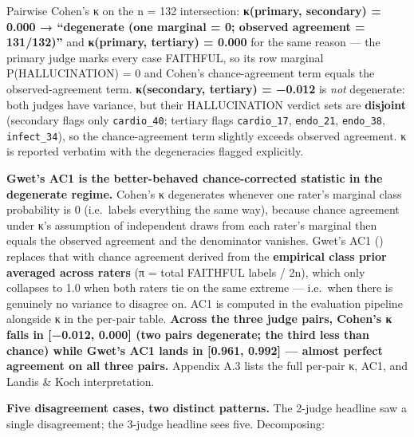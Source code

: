 \documentclass[
  american,
  a4paper,
]{article}
\begin{document}
Pairwise Cohen's κ on the n = 132 intersection: \textbf{κ(primary,
secondary) = 0.000 → ``degenerate (one marginal = 0; observed agreement
= 131/132)''} and \textbf{κ(primary, tertiary) = 0.000} for the same
reason --- the primary judge marks every case FAITHFUL, so its row
marginal P(HALLUCINATION) = 0 and Cohen's chance-agreement term equals
the observed-agreement term. \textbf{κ(secondary, tertiary) = −0.012} is
\emph{not} degenerate: both judges have variance, but their
HALLUCINATION verdict sets are \textbf{disjoint} (secondary flags only
\texttt{cardio\_40}; tertiary flags \texttt{cardio\_17},
\texttt{endo\_21}, \texttt{endo\_38}, \texttt{infect\_34}), so the
chance-agreement term slightly exceeds observed agreement. κ is reported
verbatim with the degeneracies flagged explicitly.

\textbf{Gwet's AC1 is the better-behaved chance-corrected statistic in
the degenerate regime.} Cohen's κ degenerates whenever one rater's
marginal class probability is 0 (i.e.~labels everything the same way),
because chance agreement under κ's assumption of independent draws from
each rater's marginal then equals the observed agreement and the
denominator vanishes. Gwet's AC1 () replaces that with chance agreement derived from the
\textbf{empirical class prior averaged across raters} (π = total
FAITHFUL labels / 2n), which only collapses to 1.0 when both raters tie
on the same extreme --- i.e.~when there is genuinely no variance to
disagree on. AC1 is computed in the evaluation pipeline alongside κ in
the per-pair table. \textbf{Across the three judge pairs, Cohen's κ
falls in {[}−0.012, 0.000{]} (two pairs degenerate; the third less than
chance) while Gwet's AC1 lands in {[}0.961, 0.992{]} --- almost perfect
agreement on all three pairs.} Appendix A.3 lists the full per-pair κ,
AC1, and Landis \& Koch interpretation.

\textbf{Five disagreement cases, two distinct patterns.} The 2-judge
headline saw a single disagreement; the 3-judge headline sees five.
Decomposing:
\end{document}
